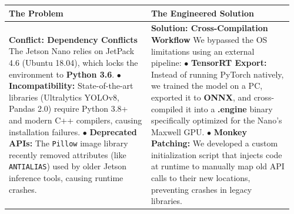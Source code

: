 {
	\renewcommand{\arraystretch}{1.5}
	\small
	
	\noindent
	\begin{tabular}{|p{0.48\linewidth}|p{0.48\linewidth}|}
		\hline
		\cellcolor{red!40!black}\textbf{\color{white} The Problem} & 
		\cellcolor{blue!40!black}\textbf{\color{white} The Engineered Solution} \\ 
		\hline
		\cellcolor{gray!10}
		\textbf{Conflict: Dependency Conflicts} \newline
		The Jetson Nano relies on JetPack 4.6 (Ubuntu 18.04), which locks the environment to \textbf{Python 3.6}.
		\newline \newline
		$\bullet$ \textbf{Incompatibility:} State-of-the-art libraries (Ultralytics YOLOv8, Pandas 2.0) require Python 3.8+ and modern C++ compilers, causing installation failures. \newline
		$\bullet$ \textbf{Deprecated APIs:} The \texttt{Pillow} image library recently removed attributes (like \texttt{ANTIALIAS}) used by older Jetson inference tools, causing runtime crashes.
		& 
		\cellcolor{gray!10}
		\textbf{Solution: Cross-Compilation Workflow} \newline
		We bypassed the OS limitations using an external pipeline:
		\newline \newline
		$\bullet$ \textbf{TensorRT Export:} Instead of running PyTorch natively, we trained the model on a PC, exported it to \textbf{ONNX}, and cross-compiled it into a \textbf{.engine} binary specifically optimized for the Nano's Maxwell GPU. \newline
		$\bullet$ \textbf{Monkey Patching:} We developed a custom initialization script that injects code at runtime to manually map old API calls to their new locations, preventing crashes in legacy libraries. \\
		\hline
	\end{tabular}
}


